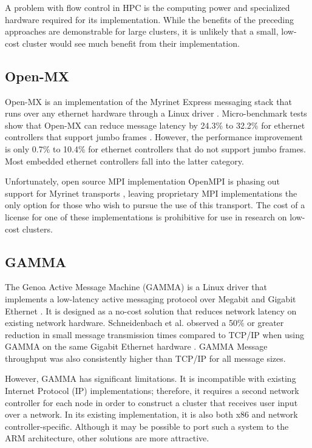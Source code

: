 \documentclass[11pt]{book}
\begin{document}
A problem with flow control in HPC is the computing power and specialized
hardware required for its implementation. While the benefits of the preceding
approaches are demonstrable for large clusters, it is unlikely that a small,
low-cost cluster would see much benefit from their implementation.

\subsection{\textbf{Open-MX}}

Open-MX is an implementation of the Myrinet Express messaging stack that runs
over any ethernet hardware through a Linux driver
\cite{goglin-08}. Micro-benchmark tests show that Open-MX can reduce message
latency by 24.3\% to 32.2\% for ethernet controllers that support jumbo frames
\cite{goglin-11}. However, the performance improvement is only 0.7\% to 10.4\%
for ethernet controllers that do not support jumbo frames. Most embedded
ethernet controllers fall into the latter category.

Unfortunately, open source MPI implementation OpenMPI is phasing out support for
Myrinet transports \cite{openmpi-myrinet}, leaving proprietary MPI implementations
the only option for those who wish to pursue the use of this transport. The cost
of a license for one of these implementations is prohibitive for use in research
on low-cost clusters.

\subsection{\textbf{GAMMA}}

The Genoa Active Message Machine (GAMMA) is a Linux driver that implements a
low-latency active messaging protocol over Megabit and Gigabit Ethernet
\cite{gamma}. It is designed as a no-cost solution that reduces network latency
on existing network hardware. Schneidenbach et al. observed a 50\% or greater
reduction in small message transmission times compared to TCP/IP when using
GAMMA on the same Gigabit Ethernet hardware \cite{schneidenbach-03}. GAMMA
Message throughput was also consistently higher than TCP/IP for all message
sizes.

However, GAMMA has significant limitations. It is incompatible with existing
Internet Protocol (IP) implementations; therefore, it requires a second network
controller for each node in order to construct a cluster that receives user
input over a network. In its existing implementation, it is also both x86 and
network controller-specific. Although it may be possible to port such a system
to the ARM architecture, other solutions are more attractive.
\end{document}
